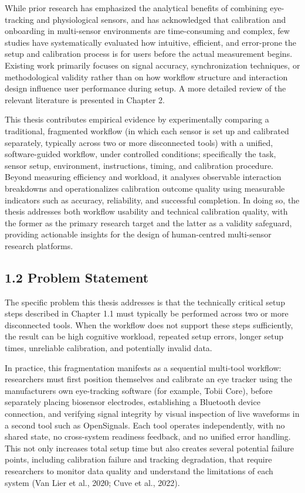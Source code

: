 \documentclass[
]{article}
\begin{document}
While prior research has emphasized the analytical benefits of combining eye-tracking and physiological sensors, and has acknowledged that calibration and onboarding in multi-sensor environments are time-consuming and complex, few studies have systematically evaluated how intuitive, efficient, and error-prone the setup and calibration process is for users before the actual measurement begins. Existing work primarily focuses on signal accuracy, synchronization techniques, or methodological validity rather than on how workflow structure and interaction design influence user performance during setup. A more detailed review of the relevant literature is presented in Chapter 2.

This thesis contributes empirical evidence by experimentally comparing a traditional, fragmented workflow (in which each sensor is set up and calibrated separately, typically across two or more disconnected tools) with a unified, software-guided workflow, under controlled conditions; specifically the task, sensor setup, environment, instructions, timing, and calibration procedure. Beyond measuring efficiency and workload, it analyses observable interaction breakdowns and operationalizes calibration outcome quality using measurable indicators such as accuracy, reliability, and successful completion. In doing so, the thesis addresses both workflow usability and technical calibration quality, with the former as the primary research target and the latter as a validity safeguard, providing actionable insights for the design of human-centred multi-sensor research platforms.

\hypertarget{problem-statement}{%
\subsection{\texorpdfstring{1.2 Problem Statement }{1.2 Problem Statement }}\label{problem-statement}}

The specific problem this thesis addresses is that the technically critical setup steps described in Chapter 1.1 must typically be performed across two or more disconnected tools. When the workflow does not support these steps sufficiently, the result can be high cognitive workload, repeated setup errors, longer setup times, unreliable calibration, and potentially invalid data.

In practice, this fragmentation manifests as a sequential multi-tool workflow: researchers must first position themselves and calibrate an eye tracker using the manufacturer\textquotesingle s own eye-tracking software (for example, Tobii Core), before separately placing biosensor electrodes, establishing a Bluetooth device connection, and verifying signal integrity by visual inspection of live waveforms in a second tool such as OpenSignals. Each tool operates independently, with no shared state, no cross-system readiness feedback, and no unified error handling. This not only increases total setup time but also creates several potential failure points, including calibration failure and tracking degradation, that require researchers to monitor data quality and understand the limitations of each system (Van Lier et al., 2020; Cuve et al., 2022).
\end{document}
